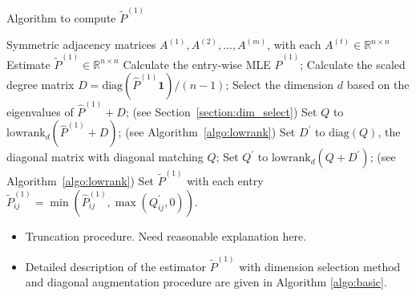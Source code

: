 \documentclass[a4paper]{article}
\renewcommand{\hat}{\widehat}
\begin{document}
\begin{algorithm}[H]
\caption{Algorithm to compute $\widetilde{P}^{(1)}$}
\label{algo:basic}
\begin{algorithmic}[1]
\REQUIRE Symmetric adjacency matrices $A^{(1)}, A^{(2)}, \dotsc, A^{(m)}$, with each $A^{(t)} \in \mathbb{R}^{n \times n}$
\ENSURE Estimate $\widetilde{P}^{(1)} \in \mathbb{R}^{n \times n}$
\STATE Calculate the entry-wise MLE $\hat{P}^{(1)}$;
\STATE Calculate the scaled degree matrix $D = \mathrm{diag}(\hat{P}^{(1)} \bm{1})/(n-1)$;
\STATE Select the dimension $d$ based on the eigenvalues of $\hat{P}^{(1)} + D$; (see Section~\ref{section:dim_select})
\STATE Set $Q$ to $\mathrm{lowrank}_d(\hat{P}^{(1)} + D)$; (see Algorithm~\ref{algo:lowrank})
\STATE Set $D^{\prime}$ to $ \mathrm{diag}(Q)$, the diagonal matrix with diagonal matching $Q$; 
\STATE Set $Q^{\prime}$ to $\mathrm{lowrank}_d(Q + D^{\prime})$; (see Algorithm~\ref{algo:lowrank})
\STATE Set $\widetilde{P}^{(1)}$ with each entry $\widetilde{P}^{(1)}_{ij} = \min( \hat{P}^{(1)}_{ij}, \max(Q^{\prime}_{ij}, 0))$.
\end{algorithmic}
\end{algorithm}

\begin{itemize}
\item Truncation procedure. Need reasonable explanation here.
\item Detailed description of the estimator $\widetilde{P}^{(1)}$ with dimension selection method and diagonal augmentation procedure are given in Algorithm \ref{algo:basic}.
\end{itemize}
\end{document}
